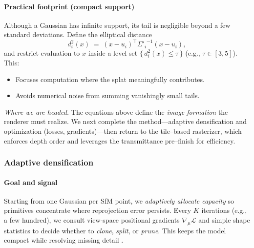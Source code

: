 \begin{enrichment}
\begin{enrichment}
\begin{enrichment}
        \paragraph{Practical footprint (compact support)}
        Although a Gaussian has infinite support, its tail is negligible beyond a few standard deviations. Define the elliptical distance
        \[
        d_i^2(x)\;=\;(x-u_i)^\top{\Sigma'_i}^{-1}(x-u_i),
        \]
        and restrict evaluation to $x$ inside a level set $\{\,d_i^2(x)\le \tau\,\}$ (e.g., $\tau\in[3,5]$). This:
        \begin{itemize}
            \item Focuses computation where the splat meaningfully contributes.
            \item Avoids numerical noise from summing vanishingly small tails.
        \end{itemize}
        
        \medskip
        \noindent\emph{Where we are headed.}
        The equations above define the \emph{image formation} the renderer must realize.
        We next complete the method—adaptive densification and optimization (losses, gradients)—then return to the tile–based rasterizer, which enforces depth order and leverages the transmittance pre–finish for efficiency.
        
        \subsubsection{Adaptive densification}\label{enr:subsubsec_chapter23_densification}
        
        \paragraph{Goal and signal}
        Starting from one Gaussian per SfM point, we \emph{adaptively allocate capacity} so primitives concentrate where reprojection error persists.
        Every $K$ iterations (e.g., a few hundred), we consult view-space positional gradients $\nabla_{\mu}\mathcal{L}$ and simple shape statistics to decide whether to \emph{clone}, \emph{split}, or \emph{prune}.
        This keeps the model compact while resolving missing detail \cite{kerbl2023_3dgaussiansplatting}.
        

\end{enrichment}
\end{enrichment}
\end{enrichment}
